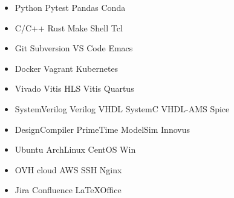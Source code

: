 \documentclass[a4paper]{MagicalCV}
\begin{document}
\begin{minipage}[t]{0.32\textwidth}
\begin{itemize}
\item Python \tb Pytest \tb Pandas \tb Conda
\item C/C++ \tb Rust \tb Make \tb Shell \tb Tcl
\item Git \tb Subversion \tb VS Code \tb Emacs
\item Docker \tb Vagrant \tb Kubernetes
\end{itemize}
\sectionsep


\begin{itemize}
\item Vivado \tb Vitis HLS \tb Vitis \tb Quartus
\item SystemVerilog \tb Verilog \tb VHDL \tb SystemC \tb VHDL-AMS \tb Spice
\item DesignCompiler \tb PrimeTime \tb ModelSim \tb Innovus
\end{itemize}
\sectionsep


\begin{itemize}
\item Ubuntu \tb ArchLinux \tb CentOS \tb Win
\item OVH cloud \tb AWS \tb SSH \tb Nginx
\item Jira \tb Confluence \tb \LaTeX \tb Office
\end{itemize}
\sectionsep




\end{minipage} 
\hfill
\end{document}
